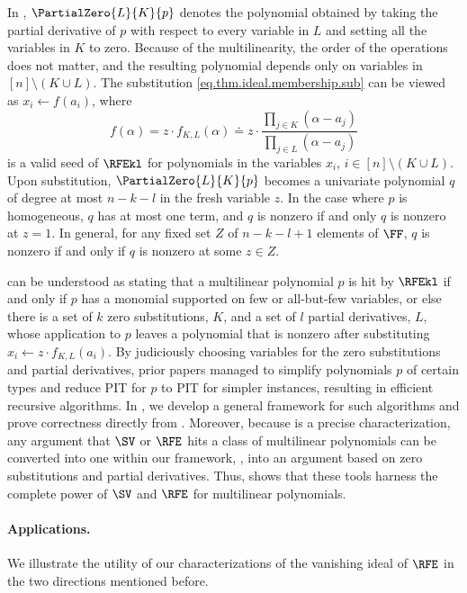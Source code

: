 In ,
$\PartialZero{L}{K}{p}$ denotes the polynomial obtained by taking the partial derivative of $p$ with respect to every variable in $L$ and setting all the variables in $K$ to zero.
Because of the multilinearity, the order of the operations does not matter,
and the resulting polynomial depends only on variables in
\([n]\setminus (K\cup L)\). The substitution \eqref{eq.thm.ideal.membership.sub} can be viewed as $x_i \gets f(a_i)$, where 
\begin{equation*}
  f(\alpha) = z \cdot f_{K,L}(\alpha) \doteq z \cdot \frac{
      \prod_{j \in K} (\alpha - a_{j})
    }{
      \prod_{j \in L} (\alpha - a_{j})
    }
\end{equation*}
is a valid seed of \(\RFEkl\) for polynomials in the variables $x_i$, $i \in [n] \setminus (K \cup L)$.
Upon substitution, $\PartialZero{L}{K}{p}$ becomes a univariate polynomial $q$ of degree at most $n-k-l$ in the fresh variable $z$. In the case where $p$ is homogeneous, $q$ has at most one term, and $q$ is nonzero if and only $q$ is nonzero at $z=1$. In general, for any fixed set $Z$ of $n-k-l+1$ elements of $\FF$, $q$ is nonzero if and only if $q$ is nonzero at some $z \in Z$. 

 can be understood as stating that a multilinear polynomial \(p\) is hit by \(\RFEkl\)
if and only if
\(p\) has a monomial supported on few or all-but-few variables,
or else there is a set of $k$ zero substitutions, \(K\),
and a set of $l$ partial derivatives, \(L\),
whose application to \(p\) leaves a polynomial that is nonzero after
substituting \(x_i \gets z\cdot f_{K,L}(a_i)\).
By judiciously choosing variables for the zero substitutions and partial derivatives, prior papers managed to simplify polynomials $p$ of certain types and reduce PIT for $p$ to PIT for simpler instances, resulting in efficient recursive algorithms.
In ,
we develop a general framework for such algorithms
and prove correctness directly from .
Moreover,
because  is a precise characterization,
any argument that \(\SV\) or \(\RFE\) hits a class of multilinear polynomials
can be converted into one within our framework,
\ie, into an argument based on zero substitutions and partial derivatives.
Thus,  shows that these tools harness the complete
power of $\SV$ and $\RFE$ for multilinear polynomials.

\paragraph{Applications.}
We illustrate the utility of our characterizations of the vanishing ideal of
$\RFE$ in the two directions mentioned before.

